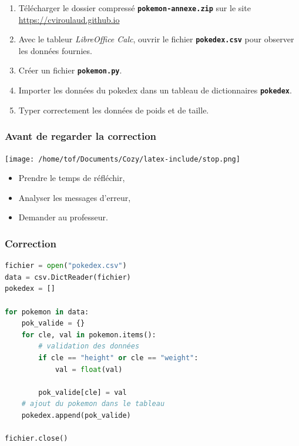 \documentclass[svgnames,11pt]{beamer}
\begin{document}
\begin{frame}
    \frametitle{}

    \begin{activite}
        \begin{enumerate}
            \item Télécharger le dossier compressé \textbf{\texttt{pokemon-annexe.zip}} sur le site \url{https://cviroulaud.github.io}
            \item Avec le tableur \emph{LibreOffice Calc}, ouvrir le fichier \texttt{\textbf{pokedex.csv}} pour observer les données fournies.
            \item Créer un fichier \texttt{\textbf{pokemon.py}}.
            \item Importer les données du pokedex dans un tableau de dictionnaires \textbf{\texttt{pokedex}}. 
            \item Typer correctement les données de poids et de taille.
        \end{enumerate}
    \end{activite}

\end{frame}
\begin{frame}
    \frametitle{Avant de regarder la correction}
\begin{center}
    \centering
    \texttt{[image: /home/tof/Documents/Cozy/latex-include/stop.png]}
    \end{center}
{\Large
    \begin{itemize}
        \item Prendre le temps de réfléchir,
        \item Analyser les messages d'erreur,
        \item Demander au professeur.
    \end{itemize}
}
\end{frame}
\begin{frame}[fragile]
    \frametitle{Correction}
    \begin{center}
        \begin{lstlisting}[language=Python , basicstyle=\ttfamily\small, xleftmargin=1em, xrightmargin=1em]
fichier = open("pokedex.csv")
data = csv.DictReader(fichier)
pokedex = []

for pokemon in data:
    pok_valide = {}
    for cle, val in pokemon.items():
        # validation des données
        if cle == "height" or cle == "weight":
            val = float(val)

        pok_valide[cle] = val
    # ajout du pokemon dans le tableau
    pokedex.append(pok_valide)

fichier.close()
\end{lstlisting}
        \label{CODE}
    \end{center}

\end{frame}
\end{document}

